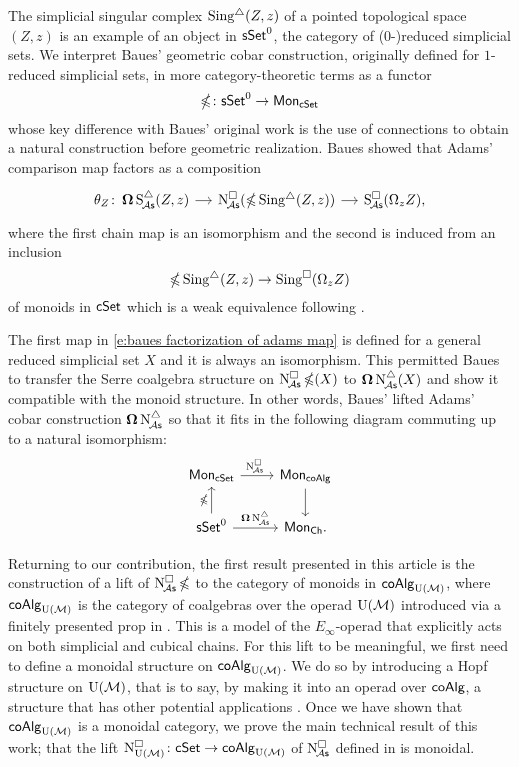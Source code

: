 The simplicial singular complex  $\operatorname{Sing^{\triangle}}(Z,z)$ of a pointed topological space $(Z,z)$ is an example of an object in $\mathsf{sSet}^0$, the category of ($0$-)reduced simplicial sets.
We interpret Baues' geometric cobar construction, originally defined for $1$-reduced simplicial sets, in more category-theoretic terms as a functor
\begin{equation} \label{e:cubical cobar construction}
\operatorname{\mathbb{\Omega}} \colon \mathsf{sSet}^0 \to \mathsf{Mon}_{\mathsf{cSet}}
\end{equation}
whose key difference with Baues' original work is the use of connections to obtain a natural construction before geometric realization.
Baues showed that Adams' comparison map factors as a composition
\begin{equation} \label{e:baues factorization of adams map}
\begin{tikzcd}[column sep = small]
\theta_Z \colon \cobar \sSchainsA(Z,z) \arrow[r] &
\cchainsA(\ccobar \sSing(Z,z)) \arrow[r] &
\cSchainsA(\loops_z Z),
\end{tikzcd}
\end{equation}
where the first chain map is an isomorphism and the second is induced from an inclusion
\[
\operatorname{\mathbb{\Omega}} \operatorname{Sing^{\triangle}}(Z,z) \to \operatorname{Sing^{\square}}(\Omega_z Z)
\]
of monoids in $\mathsf{cSet}$ which is a weak equivalence following \cite{rivera2019path}.

The first map in \eqref{e:baues factorization of adams map} is defined for a general reduced simplicial set $X$ and it is always an isomorphism.
This permitted Baues to transfer the Serre coalgebra structure on $\operatorname{N^{\square}_{\!{\mathcal{A}\mathsf{s}}}} \operatorname{\mathbb{\Omega}}(X)$ to $\operatorname{\mathbf{\Omega}} \operatorname{N^{\triangle}_{\!{\mathcal{A}\mathsf{s}}}}(X)$ and show it compatible with the monoid structure.
In other words, Baues' lifted Adams' cobar construction $\operatorname{\mathbf{\Omega}} \operatorname{N^{\triangle}_{\!{\mathcal{A}\mathsf{s}}}}$ so that it fits in the following diagram commuting up to a natural isomorphism:
\[
\begin{tikzcd}
\Mon_{\cSet} \arrow[r, "\cchainsA \ "] & \Mon_{\coAlg} \arrow[d] \\
\sSet^0 \arrow[r, "\cobar \schainsA"] \arrow[u, "\ccobar"] & \Mon_{\Ch}.
\end{tikzcd}
\]

Returning to our contribution, the first result presented in this article is the construction of a lift of $\operatorname{N^{\square}_{\!{\mathcal{A}\mathsf{s}}}} \operatorname{\mathbb{\Omega}}$ to the category of monoids in $\mathsf{coAlg}_{\operatorname{U}(\mathcal{M})}$, where $\mathsf{coAlg}_{\operatorname{U}(\mathcal{M})}$ is the category of coalgebras over the operad ${\operatorname{U}(\mathcal{M})}$ introduced via a finitely presented prop in \cite{medina2020prop1}.
This is a model of the $E_\infty$-operad that explicitly acts on both simplicial and cubical chains.
For this lift to be meaningful, we first need to define a monoidal structure on $\mathsf{coAlg}_{\operatorname{U}(\mathcal{M})}$.
We do so by introducing a Hopf structure on ${\operatorname{U}(\mathcal{M})}$, that is to say, by making it into an operad over $\mathsf{coAlg}$, a structure that has other potential applications \cite{livernet2008hopf}.
Once we have shown that $\mathsf{coAlg}_{\operatorname{U}(\mathcal{M})}$ is a monoidal category, we prove the main technical result of this work; that the lift $\operatorname{N^{\square}_{{\operatorname{U}(\mathcal{M})}}} \colon \mathsf{cSet} \to \mathsf{coAlg}_{\operatorname{U}(\mathcal{M})}$ of $\operatorname{N^{\square}_{\!{\mathcal{A}\mathsf{s}}}}$ defined in \cite{medina2021cubical} is monoidal.

